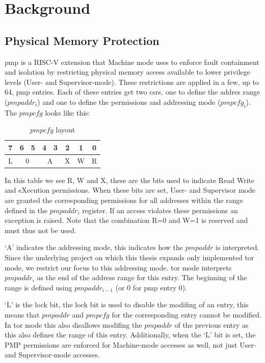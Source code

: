 \glsresetall


\chapter{Background}

\section{Physical Memory Protection}\label{cha:pmp}

\Gls{pmp} is a RISC-V extension that Machine mode uses to enforce fault containment and isolation by restricting physical memory access available to lower privilege levels (User- and Supervisor-mode).
These restrictions are applied in a few, up to 64, \gls{pmp} entries.
Each of these entries get two \glspl{csr}, one to define the addres range ($pmpaddr_i$) and one to define the permissions and addressing mode ($pmpcfg_i$).
\\
The $pmpcfg$ looks like this:
\begin{table}[h]
\centering
\begin{tabular}{cccccccc}
7                       & 6          & 5         & 4          & 3         & 2                      & 1                      & 0                      \\ \hline
\multicolumn{1}{|c|}{L} & \multicolumn{2}{c|}{0} & \multicolumn{2}{c|}{A} & \multicolumn{1}{c|}{X} & \multicolumn{1}{c|}{W} & \multicolumn{1}{c|}{R} \\ \hline
\end{tabular}
\caption{$pmpcfg$ layout}
\label{table:pmpcfg_layout}
\cite{pmp_docs}
\end{table}

In this table we see R, W and X, these are the bits used to indicate Read Write and eXecution permissions.
When these bits are set, User- and Supervisor mode are granted the corresponding permissions for all addresses within the range defined in the $pmpaddr_i$ register.
If an access violates these permissions an exception is raised.
Note that the combination R=0 and W=1 is reserved and must thus not be used.

`A' indicates the addressing mode, this indicates how the $pmpaddr$ is interpreted.
Since the underlying project on which this thesis expands only implemented \gls{tor} mode, we restrict our focus to this addressing mode.
\Gls{tor} mode interprets $pmpaddr_i$ as the end of the address range for this entry.
The beginning of the range is defined using $pmpaddr_{i-1}$ (or 0 for \gls{pmp} entry 0).

`L' is the lock bit, the lock bit is used to disable the modifing of an entry, this means that $pmpaddr$ and $pmpcfg$ for the corresponding entry cannot be modified.
In \gls{tor} mode this also disallows modifing the $pmpaddr$ of the previous entry as this also defines the range of this entry.
Additionally, when the `L' bit is set, the PMP permissions are enforced for Machine-mode accesses as well, not just User- and Supervisor-mode accesses.